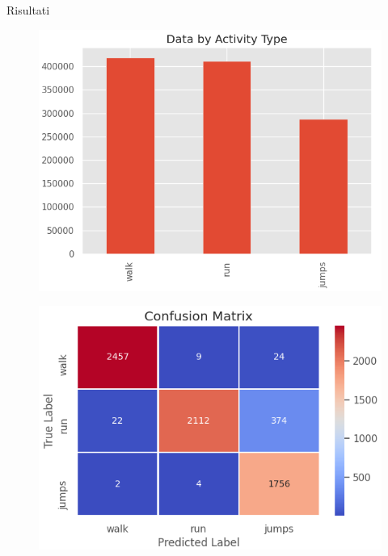 \begin{tframe}{Risultati}

    \begin{minipage}{0.50\textwidth}
        
        \begin{figure}
            \includegraphics[scale = 0.22]{assets/images/results/activity-type-graph-right-hand-acc-cut.png}
        \end{figure}

    \end{minipage}%
    \hfill
    \begin{minipage}{0.50\textwidth}
        
        \begin{figure}
            \includegraphics[scale = 0.26]{assets/images/results/confusion-matrix-right-hand-acc-cut.png}
        \end{figure}
        

\end{minipage}
\end{tframe}
